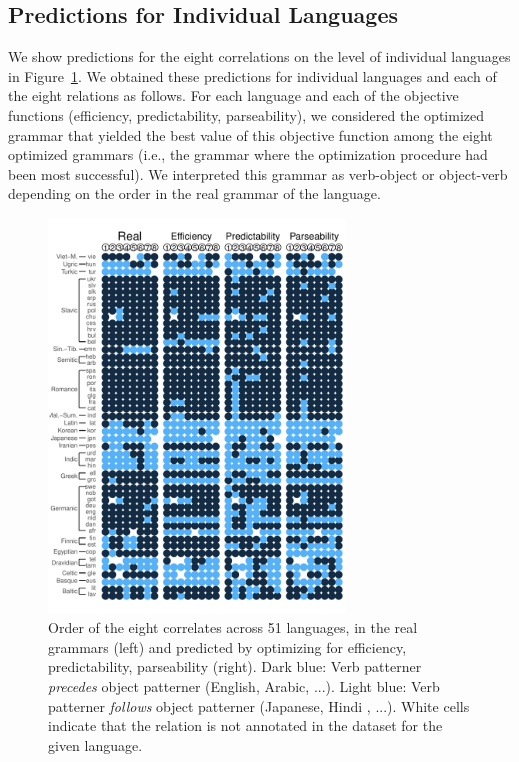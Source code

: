 \documentclass[10pt,twoside,lineno]{article}
\begin{document}
\subsection{Predictions for Individual Languages}


We show predictions for the eight correlations on the level of individual languages in Figure~\ref{fig:per-lang}.
We obtained these predictions for individual languages and each of the eight relations as follows.
For each language and each of the objective functions (efficiency, predictability, parseability), we considered the optimized grammar that yielded the best value of this objective function among the eight optimized grammars (i.e., the grammar where the optimization procedure had been most successful).
We interpreted this grammar as verb-object or object-verb depending on the order in the real grammar of the language.


\begin{figure} 
	\begin{center}
	\includegraphics[width=0.7\textwidth]{../results/correlations/figures/pred-eff-pred-pars-families-2.pdf} 
	\end{center}
	\caption{Order of the eight correlates across 51 languages, in the real grammars (left) and predicted by optimizing for efficiency, predictability, parseability (right). Dark blue: Verb patterner \emph{precedes} object patterner (English, Arabic, ...). Light blue: Verb patterner \emph{follows} object patterner (Japanese, Hindi , ...). White cells indicate that the relation is not annotated in the dataset for the given language.}\label{fig:per-lang}
\end{figure}
\end{document}
